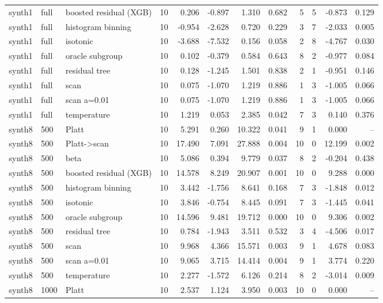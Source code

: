 \begin{tabular}{lllrrrrrrrrr}
synth1 & full & boosted residual (XGB) & 10 & 0.206 & -0.897 & 1.310 & 0.682 & 5 & 5 & -0.873 & 0.129 \\
synth1 & full & histogram binning & 10 & -0.954 & -2.628 & 0.720 & 0.229 & 3 & 7 & -2.033 & 0.005 \\
synth1 & full & isotonic & 10 & -3.688 & -7.532 & 0.156 & 0.058 & 2 & 8 & -4.767 & 0.030 \\
synth1 & full & oracle subgroup & 10 & 0.102 & -0.379 & 0.584 & 0.643 & 8 & 2 & -0.977 & 0.084 \\
synth1 & full & residual tree & 10 & 0.128 & -1.245 & 1.501 & 0.838 & 2 & 1 & -0.951 & 0.146 \\
synth1 & full & scan & 10 & 0.075 & -1.070 & 1.219 & 0.886 & 1 & 3 & -1.005 & 0.066 \\
synth1 & full & scan a=0.01 & 10 & 0.075 & -1.070 & 1.219 & 0.886 & 1 & 3 & -1.005 & 0.066 \\
synth1 & full & temperature & 10 & 1.219 & 0.053 & 2.385 & 0.042 & 7 & 3 & 0.140 & 0.376 \\
synth8 & 500 & Platt & 10 & 5.291 & 0.260 & 10.322 & 0.041 & 9 & 1 & 0.000 & -- \\
synth8 & 500 & Platt->scan & 10 & 17.490 & 7.091 & 27.888 & 0.004 & 10 & 0 & 12.199 & 0.002 \\
synth8 & 500 & beta & 10 & 5.086 & 0.394 & 9.779 & 0.037 & 8 & 2 & -0.204 & 0.438 \\
synth8 & 500 & boosted residual (XGB) & 10 & 14.578 & 8.249 & 20.907 & 0.001 & 10 & 0 & 9.288 & 0.000 \\
synth8 & 500 & histogram binning & 10 & 3.442 & -1.756 & 8.641 & 0.168 & 7 & 3 & -1.848 & 0.012 \\
synth8 & 500 & isotonic & 10 & 3.846 & -0.754 & 8.445 & 0.091 & 7 & 3 & -1.445 & 0.041 \\
synth8 & 500 & oracle subgroup & 10 & 14.596 & 9.481 & 19.712 & 0.000 & 10 & 0 & 9.306 & 0.002 \\
synth8 & 500 & residual tree & 10 & 0.784 & -1.943 & 3.511 & 0.532 & 3 & 4 & -4.506 & 0.017 \\
synth8 & 500 & scan & 10 & 9.968 & 4.366 & 15.571 & 0.003 & 9 & 1 & 4.678 & 0.083 \\
synth8 & 500 & scan a=0.01 & 10 & 9.065 & 3.715 & 14.414 & 0.004 & 9 & 1 & 3.774 & 0.220 \\
synth8 & 500 & temperature & 10 & 2.277 & -1.572 & 6.126 & 0.214 & 8 & 2 & -3.014 & 0.009 \\
synth8 & 1000 & Platt & 10 & 2.537 & 1.124 & 3.950 & 0.003 & 10 & 0 & 0.000 & -- \\

\end{tabular}
